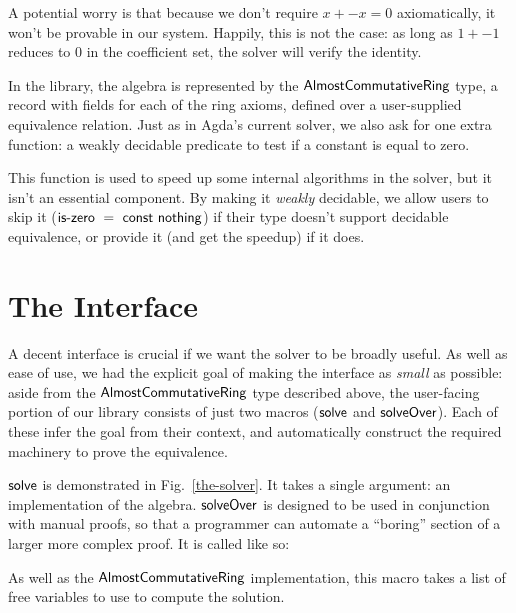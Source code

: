 \documentclass[acmsmall,review,anonymous]{acmart}\settopmatter{printfolios=true,printccs=false,printacmref=false}
\theoremstyle{remark}
\begin{document}
A potential worry is that because we don't require \(x + -x = 0\) axiomatically,
it won't be provable in our system. Happily, this is not the case: as long as
\(1 + -1\) reduces to \(0\) in the coefficient set, the solver will verify the
identity.

In the library, the algebra is represented by the
\(\AgdaDatatype{AlmostCommutativeRing}\) type, a record with fields for each of
the ring axioms, defined over a user-supplied equivalence relation. Just as in
Agda's current solver, we also ask for one extra function: a weakly decidable
predicate to test if a constant is equal to zero.
\begin{center}
\end{center}
This function is used to speed up some internal algorithms in the solver, but it
isn't an essential component. By making it \emph{weakly} decidable, we allow
users to skip it
(\(\AgdaFunction{is-zero}~=~\AgdaFunction{const}~\AgdaInductiveConstructor{nothing}\))
if their type doesn't support decidable equivalence, or provide it (and get the
speedup) if it does.
\section{The Interface}
A decent interface is crucial if we want the solver to be broadly useful. As
well as ease of use, we had the explicit goal of making the interface as
\emph{small} as possible: aside from the
\(\AgdaDatatype{AlmostCommutativeRing}\) type described above, the user-facing
portion of our library consists of just two macros (\(\AgdaMacro{solve}\) and
\(\AgdaMacro{solveOver}\)). Each of these infer the goal from their context, and
automatically construct the required machinery to prove the equivalence.

\(\AgdaMacro{solve}\) is demonstrated in Fig.~\ref{the-solver}. It takes a
single argument: an implementation of the algebra. \(\AgdaMacro{solveOver}\) is
designed to be used in conjunction with manual proofs, so that a programmer can
automate a ``boring'' section of a larger more complex proof. It is called like
so:

\begin{centering}
\end{centering}

As well as the \(\AgdaDatatype{AlmostCommutativeRing}\) implementation, this
macro takes a list of free variables to use to compute the solution.
\end{document}
